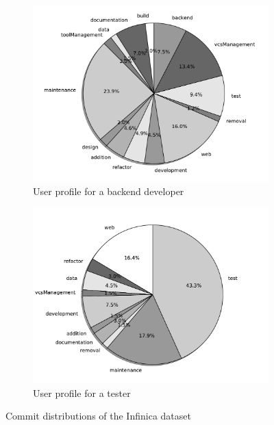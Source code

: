 \begin{figure}[ht]
   \centering
   \begin{subfigure}[t]{.5\textwidth}
      \centering
      \includegraphics[width=\linewidth]{ResourceClassification/figures/infinica_developer.pdf}
      \caption{User profile for a backend developer}
      \label{fig:developer} 
   \end{subfigure}%
   \begin{subfigure}[t]{.5\textwidth}
      \centering
      \includegraphics[width=\linewidth]{ResourceClassification/figures/infinica_tester.pdf}
      \caption{User profile for a tester}
      \label{fig:tester} 
   \end{subfigure}
   \caption{Commit distributions of the Infinica dataset}
   \label{fig:test}
\end{figure}

